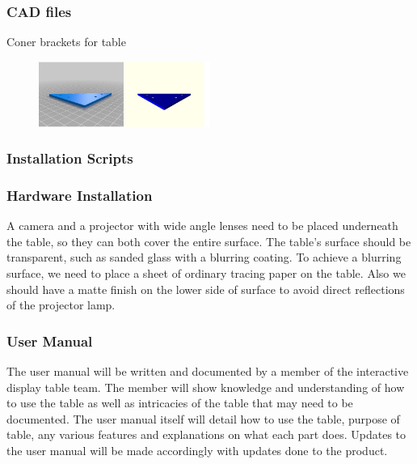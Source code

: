 \subsubsection{CAD files}
Coner brackets for table
\begin{figure}[h!]
    \centering
    \includegraphics[width=0.5\textwidth]{images/corner_bracket.jpg}
\end{figure}

\subsubsection{Installation Scripts}
\subsubsection{Hardware Installation}
A camera and a projector with wide angle lenses need to be placed underneath the table, so they can both cover the entire surface. The table's surface should be transparent, such as sanded glass with a blurring coating. To achieve a blurring surface, we need to place a sheet of ordinary tracing paper on the table. Also we should have a matte finish on the lower side of surface to avoid direct reflections of the projector lamp. 

\subsubsection{User Manual}
The user manual will be written and documented by a member of the interactive display table team. The member will show knowledge and understanding of how to use the table as well as intricacies of the table that may need to be documented. The user manual itself will detail how to use the table, purpose of table, any various features and explanations on what each part does. Updates to the user manual will be made accordingly with updates done to the product. 
